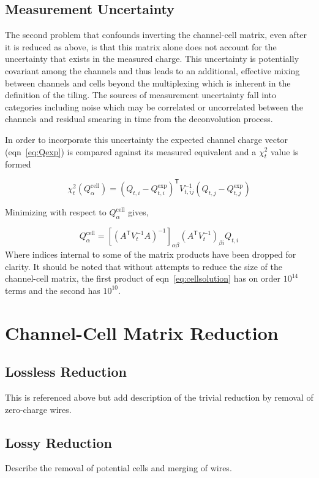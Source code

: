 \documentclass[letter]{article}
\def\mQdec{Q_{t,i}}
\def\mQexp{Q^{\mathrm{exp}}_{t,i}}
\def\mVcov{V_{t,ij}}
\def\mQcell{Q^{\mathrm{cell}}_\alpha}
\def\Qcell{$\mQcell$\xspace}
\begin{document}
\subsection{Measurement Uncertainty}

The second problem that confounds inverting the channel-cell matrix,
even after it is reduced as above, is that this matrix alone does not
account for the uncertainty that exists in the measured charge.
This uncertainty is potentially covariant among the channels and thus
leads to an additional, effective mixing between channels and cells
beyond the multiplexing which is inherent in the definition of the
tiling.
The sources of measurement uncertainty fall into categories including
noise which may be correlated or uncorrelated between the channels and
residual smearing in time from the deconvolution process.

In order to incorporate this uncertainty the expected channel charge
vector (eqn~\ref{eq:Qexp}) is compared against its measured equivalent and 
a $\chi^2_t$ value is formed


\begin{equation}
  \label{eq:chi2}
  \chi^2_t(\mQcell) = (\mQdec - \mQexp)^\mathsf{T}\mVcov^{-1}(Q_{t,j} - Q^{\mathrm{exp}}_{t,j})
\end{equation}

\noindent Minimizing with respect to \Qcell gives,

\begin{equation}
  \label{eq:cellsolution}
  \mQcell = [(A^\mathsf{T}V_t^{-1}A)^{-1}]_{\alpha\beta}
  (A^\mathsf{T}V_t^{-1})_{\beta i}\mQdec
\end{equation}
Where indices internal to some of the matrix products have been
dropped for clarity.
It should be noted that without attempts to reduce the size of the
channel-cell matrix, the first product of eqn~\ref{eq:cellsolution}
has on order $10^{14}$ terms and the second has $10^{10}$.

\section{Channel-Cell Matrix Reduction}

\subsection{Lossless Reduction}

This is referenced above but add description of the trivial reduction
by removal of zero-charge wires.

\subsection{Lossy Reduction}

Describe the removal of potential cells and merging of wires.
\end{document}

